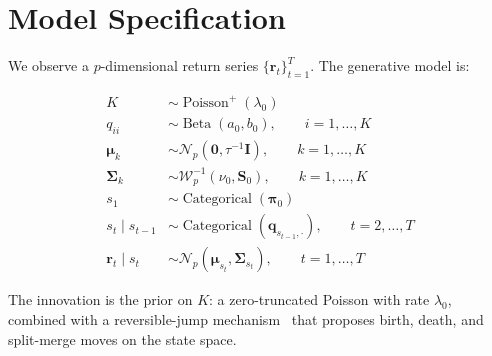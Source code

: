 \section{Model Specification}

We observe a $p$-dimensional return series $\{\mathbf{r}_t\}_{t=1}^{T}$. The generative model is:

\begin{dukebox}[title={Hierarchical Model},colbacktitle=DukeBlue!15]
\begin{align}
K &\sim \operatorname{Poisson}^{+}(\lambda_0) \label{eq:priork} \\
q_{ii} &\sim \operatorname{Beta}(a_0, b_0), \qquad i=1,\dots,K \label{eq:priordiag} \\
\boldsymbol{\mu}_k &\sim \mathcal{N}_p(\mathbf{0}, \tau^{-1}\mathbf{I}), \qquad k=1,\dots,K \label{eq:priormean} \\
\boldsymbol{\Sigma}_k &\sim \mathcal{W}^{-1}_p(\nu_0, \mathbf{S}_0), \qquad k=1,\dots,K \label{eq:priorsigma} \\
s_1 &\sim \operatorname{Categorical}(\boldsymbol{\pi}_0) \nonumber \\
s_t \mid s_{t-1} &\sim \operatorname{Categorical}(\mathbf{q}_{s_{t-1},\cdot}), \qquad t=2,\dots,T \nonumber \\
\mathbf{r}_t \mid s_t &\sim \mathcal{N}_p(\boldsymbol{\mu}_{s_t}, \boldsymbol{\Sigma}_{s_t}), \qquad t=1,\dots,T \nonumber
\end{align}
\end{dukebox}

\noindent The innovation is the prior on $K$: a zero-truncated Poisson with rate $\lambda_0$, combined with a reversible-jump mechanism~\cite{green1995} that proposes birth, death, and split-merge moves on the state space.
